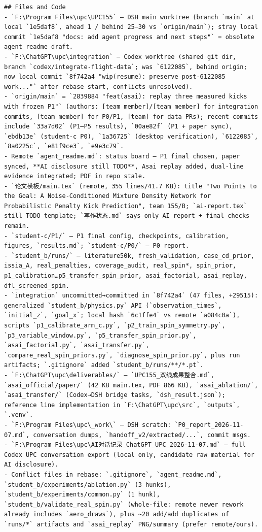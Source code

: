 \documentclass[UTF8,10pt]{ctexart}
\begin{document}
\begin{Verbatim}[breaklines=true,breakanywhere=true,fontsize=\scriptsize,frame=single,framesep=2pt]
## Files and Code
- `F:\Program Files\upc\UPC155` — DSH main worktree (branch `main` at local `1e5daf8`, ahead 1 / behind 25–30 vs `origin/main`); stray local commit `1e5daf8 "docs: add agent progress and next steps"` = obsolete agent_readme draft.
- `F:\ChatGPT\upc\integration` — Codex worktree (shared git dir, branch `codex/integrate-flight-data`; was `6122085`, behind origin; now local commit `8f742a4 "wip(resume): preserve post-6122085 work..."` after rebase start, conflicts unresolved).
- `origin/main` = `2839884 "feat(asai): replay three measured kicks with frozen P1"` (authors: [team member]/[team member] for integration commits, [team member] for P0/P1, [team] for data PRs); recent commits include `33a7d02` (P1–P5 results), `00ae82f` (P1 + paper sync), `ebdb13e` (student-c P0), `1a36725` (desktop verification), `6122085`, `8a0225c`, `e81f9ce3`, `e9e3c79`.
- Remote `agent_readme.md`: status board — P1 final chosen, paper synced, **AI disclosure still TODO**, Asai replay added, dual-line evidence integrated; PDF in repo stale.
- `论文模板/main.tex` (remote, 355 lines/41.7 KB): title "Two Points to the Goal: A Noise-Conditioned Mixture Density Network for Probabilistic Penalty Kick Prediction", team 155/B; `ai-report.tex` still TODO template; `写作状态.md` says only AI report + final checks remain.
- `student-c/P1/` — P1 final config, checkpoints, calibration, figures, `results.md`; `student-c/P0/` — P0 report.
- `student_b/runs/` — literature50k, fresh_validation, case_cd_prior, issia_A, real_penalties, coverage_audit, real_spin*, spin_prior, p1_calibration…p5_transfer_spin_prior, asai_factorial, asai_replay, dfl_screened_spin.
- `integration` uncommitted→committed in `8f742a4` (47 files, +29515): generalized `student_b/physics.py` API (`observation_times`, `initial_z`, `goal_x`; local hash `6c1ffe4` vs remote `a084c0a`), scripts `p1_calibrate_arm_c.py`, `p2_train_spin_symmetry.py`, `p3_variable_window.py`, `p5_transfer_spin_prior.py`, `asai_factorial.py`, `asai_transfer.py`, `compare_real_spin_priors.py`, `diagnose_spin_prior.py`, plus run artifacts; `.gitignore` added `student_b/runs/**/*.pt`.
- `F:\ChatGPT\upc\deliverables/` — `UPC155_双线成果整合.md`, `asai_official/paper/` (42 KB main.tex, PDF 866 KB), `asai_ablation/`, `asai_transfer/` (Codex→DSH bridge tasks, `dsh_result.json`); reference line implementation in `F:\ChatGPT\upc\src`, `outputs`, `.venv`.
- `F:\Program Files\upc\_work\` — DSH scratch: `P0_report_2026-11-07.md`, conversation dumps, `handoff_v2/extracted/...`, commit msgs.
- `F:\Program Files\upc\AI对话记录_ChatGPT_UPC_2026-11-07.md` — full Codex UPC conversation export (local only, candidate raw material for AI disclosure).
- Conflict files in rebase: `.gitignore`, `agent_readme.md`, `student_b/experiments/ablation.py` (3 hunks), `student_b/experiments/common.py` (1 hunk), `student_b/validate_real_spin.py` (whole-file: remote newer rework already includes `aero_draws`), plus ~20 add/add duplicates of `runs/*` artifacts and `asai_replay` PNG/summary (prefer remote/ours).


\end{Verbatim}
\end{document}
